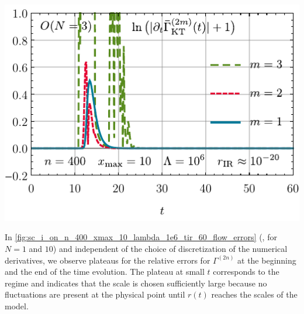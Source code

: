 	{%
		\includegraphics[width=\subcaptionFigureWidth]{0d/figures/sc_i_on_3_n_400_xmax_10_lambda_1e6_tir_60_changing_rates.pdf} %
		\captionsetup{width=\subcaptionFigureWidth}%
		\caption{
			The rate of change in $t$ of $\bar{\Gamma}^{(2m)} ( t )$ at the \ir{} minimum $\sigma = 0$ for $n = 1, 2, 3$ during the \frg{} flow.
			This rate of change is defined as the numerical \rgtime{} derivative $\partial_t \bar{\Gamma}^{(2m)} ( t )$ over the \rgtime{}.
			$\partial_t \bar{\Gamma}^{(2m)} ( t )$ are calculated via a finite-difference approximation ${[\bar{\Gamma}^{(2m)} (t) - \bar{\Gamma}^{(2m)} (t - \Delta t) ]/\Delta t}$, where $\Delta t = 0.2$.
			$\bar{\Gamma}^{(2m)} ( t )$ are obtained via numerical derivatives \eqref{eq:derivative_1_central_error_2}, \eqref{eq:derivative_3_central_error_2}, and \eqref{eq:derivative_5_central_error_2} of $u (t, \sigma)$ at $x = \sigma = 0$.
			For convenience, we added 1 and took the logarithm to highlight the regions with high rates of change of the observables $\bar{\Gamma}^{(2m)}(t)$ and to identify the freeze-out plateau, where these rates vanish.
			We used the exponential regulator~\eqref{eq:exponential_regulator} with \uv{} scale $\Lambda = 10^6$.
		}
		\label{fig:sc_i_on_3_n_400_xmax_10_lambda_1e6_tir_60_changing_rates}
	}
In \cref{fig:sc_i_on_n_400_xmax_10_lambda_1e6_tir_60_flow_errors} (\ie{}, for $N = 1$ and $10$) and independent of the choice of discretization of the numerical derivatives, we observe plateaus for the relative errors for $\Gamma^{(2n)}$ at the beginning and the end of the \frg{} time evolution.
The plateau at small $t$ corresponds to the \uv{} regime and indicates that the \uv{} scale is chosen sufficiently large because no fluctuations are present at the \ir{} physical point until $r(t)$ reaches the scales of the model.
